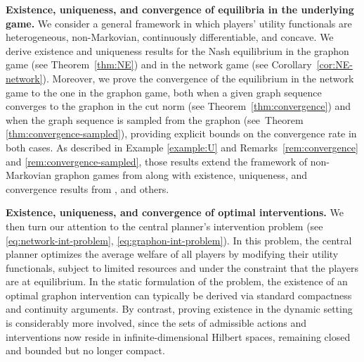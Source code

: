 \documentclass[11pt]{article}
\numberwithin{equation}{section}
\begin{document}
\textbf{Existence, uniqueness, and convergence of equilibria in the underlying game. }
We consider a general framework in which players’ utility functionals are heterogeneous, non-Markovian, continuously differentiable, and concave. We derive existence and uniqueness results for the Nash equilibrium in the graphon game (see Theorem~\ref{thm:NE}) and in the network game (see Corollary~\ref{cor:NE-network}). Moreover, we prove the convergence of the equilibrium in the network game to the one in the graphon game, both when a given graph sequence converges to the graphon in the cut norm (see Theorem~\ref{thm:convergence}) and when the graph sequence is sampled from the graphon (see~Theorem \ref{thm:convergence-sampled}), providing explicit bounds on the convergence rate in both cases. As described in Example \ref{example:U} and Remarks~\ref{rem:convergence} and \ref{rem:convergence-sampled}, those results extend the framework of non-Markovian graphon games from \cite{abijaber2023equilibrium,neuman2024stochastic} along with existence, uniqueness, and convergence results from \citet{aurell2022stochastic,bayraktar2023propagation,carmona2022stochastic,gao2020linear,lacker2023label,parise2023graphon,tangpi2024optimal}, and others. 

\textbf{Existence, uniqueness, and convergence of optimal interventions.}
We then turn our attention to the central planner’s intervention problem (see \eqref{eq:network-int-problem}, \eqref{eq:graphon-int-problem}). In this problem, the central planner optimizes the average welfare of all players by modifying their utility functionals, subject to limited resources and under the constraint that the players are at equilibrium. 
In the static formulation of the problem, the existence of an optimal graphon intervention can typically be derived via standard compactness and continuity arguments. By contrast, proving existence in the dynamic setting is considerably more involved, since the sets of admissible actions and interventions now reside in infinite-dimensional Hilbert spaces, remaining closed and bounded but no longer compact. %
\end{document}
